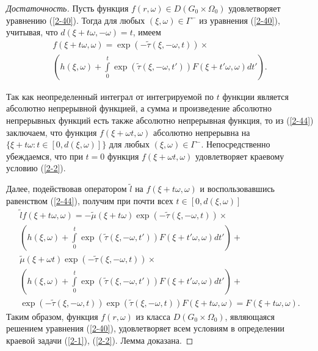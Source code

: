 \begin{proof}[Достаточность]
Пусть функция $f(r,\omega) \in D(G_0 \times
\Omega_0)$ удовлетворяет уравнению (\ref{2-40}). Тогда для любых
$(\xi,\omega) \in \Gamma^-$ из уравнения  (\ref{2-40}), учитывая,
что $d(\xi + t \omega, - \omega) = t$, имеем
\begin{multline}
    \label{2-44}
    f(\xi + t \omega, \omega) = \exp (- \widetilde{\tau}
    (\xi,-\omega,t))\times \\ \left( h(\xi, \omega) + \int
    \limits^{t}_{0} \exp ( \widetilde{\tau} (\xi,-\omega,t'))F(\xi + t
    ' \omega, \omega) dt' \right).
\end{multline}

Так как неопределенный интеграл от интегрируемой по $t$ функции
является абсолютно непрерывной функцией, а сумма и произведение
абсолютно непрерывных функций есть также абсолютно непрерывная
функция, то из (\ref{2-44}) заключаем, что функция
$f(\xi + \omega t, \omega)$ абсолютно непрерывна на
$\{\xi+ t \omega :t \in [0,d(\xi,\omega)] \}$ для любых $(\xi,\omega) \in \Gamma^-$.
Непосредственно убеждаемся, что при $t = 0$ функция $f(\xi +
\omega t, \omega)$ удовлетворяет краевому условию (\ref{2-2}).

Далее, подействовав оператором $\widetilde{l}$ на $f(\xi +
t\omega,\omega)$ и воспользовавшись равенством (\ref{2-44}),
получим при почти всех $t \in [0,d(\xi,\omega)]$
\begin{multline*}
    \widetilde{l}f(\xi + t\omega,\omega) = - \widetilde{\mu} (\xi +
    t\omega) \exp (- \widetilde{\tau}(\xi,-\omega,t)) \times \\
    \left(h(\xi,\omega) + \int \limits^{t}_{0} \exp (\widetilde{\tau}
    (\xi,-\omega,t')) F(\xi + t' \omega,\omega)dt' \right) +
    \\
    \widetilde{\mu} (\xi + \omega t) \exp (-\widetilde{\tau}
    (\xi,-\omega,t)) \times \\ \left( h(\xi,\omega) + \int
    \limits^{t}_{0} \exp (\widetilde{\tau} (\xi,-\omega,t'))F(\xi + t'
    \omega,\omega) dt' \right) +
    \\
    \exp (-\widetilde{\tau} (\xi,-\omega,t)) \exp (\widetilde{\tau}
    (\xi,-\omega,t))F(\xi + t\omega,\omega) = F(\xi + t\omega,\omega).
\end{multline*}
Таким образом, функция $f(r,\omega)$ из класса $D(G_0 \times
\Omega_0)$, являющаяся решением уравнения (\ref{2-40}),
удовлетворяет всем условиям в определении краевой задачи
(\ref{2-1}), (\ref{2-2}). Лемма доказана.
\end{proof}

